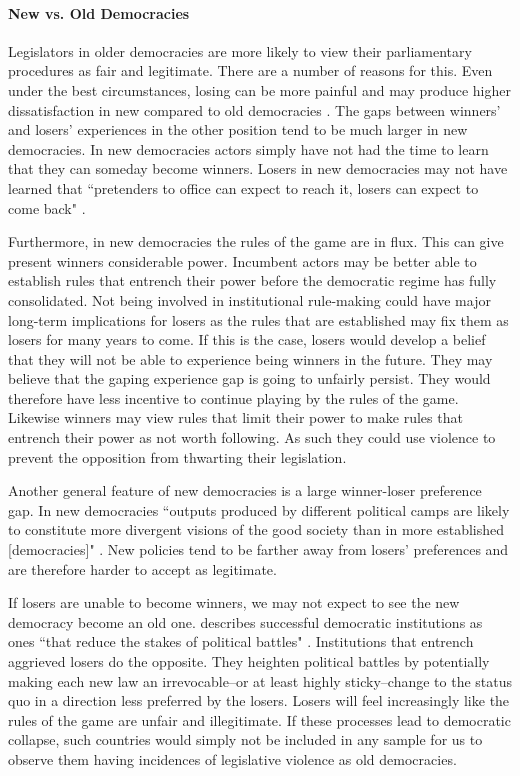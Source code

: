 \documentclass[a4paper]{article}\usepackage{graphicx, color}
\begin{document}
\paragraph{New vs. Old Democracies}

Legislators in older democracies are more likely to view their parliamentary procedures as fair and legitimate. There are a number of reasons for this. Even under the best circumstances, losing can be more painful and may produce higher dissatisfaction in new compared to old democracies \cite{Anderson2005}. The gaps between winners' and losers' experiences in the other position tend to be much larger in new democracies. In new democracies actors simply have not had the time to learn that they can someday become winners. Losers in new democracies may not have learned that ``pretenders to office can expect to reach it, losers can expect to come back" \citep[][36]{Przeworski1991}. 

Furthermore, in new democracies the rules of the game are in flux. This can give present winners considerable power. Incumbent actors may be better able to establish rules that entrench their power before the democratic regime has fully consolidated. Not being involved in institutional rule-making could have major long-term implications for losers as the rules that are established may fix them as losers for many years to come. If this is the case, losers would develop a belief that they will not be able to experience being winners in the future. They may believe that the gaping experience gap is going to unfairly persist. They would therefore have less incentive to continue playing by the rules of the game. Likewise winners may view rules that limit their power to make rules that entrench their power as not worth following. As such they could use violence to prevent the opposition from thwarting their legislation. 

Another general feature of new democracies is a large winner-loser preference gap. In new democracies ``outputs produced by different political camps are likely to constitute more divergent visions of the good society than in more established [democracies]" \citep[][92]{Anderson2005}. New policies tend to be farther away from losers' preferences and are therefore harder to accept as legitimate. 

If losers are unable to become winners, we may not expect to see the new democracy become an old one. \citeauthor{Przeworski1991} describes successful democratic institutions as ones ``that reduce the stakes of political battles" \citeyearpar[][36]{Przeworski1991}. Institutions that entrench aggrieved losers do the opposite. They heighten political battles by potentially making each new law an irrevocable--or at least highly sticky--change to the status quo in a direction less preferred by the losers. Losers will feel increasingly like the rules of the game are unfair and illegitimate. If these processes lead to democratic collapse, such countries would simply not be included in any sample for us to observe them having incidences of legislative violence as old democracies. 
\end{document}
